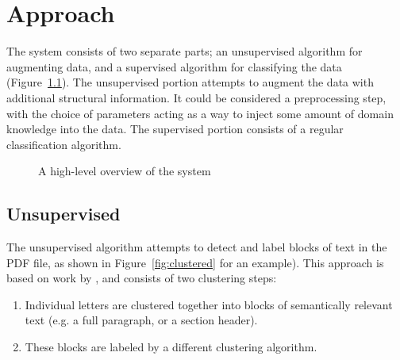 \chapter{Approach}

The system consists of two separate parts; an unsupervised algorithm for
augmenting data, and a supervised algorithm for classifying the data
(Figure~\ref{fig:overview}). The unsupervised portion attempts to augment the
data with additional structural information. It could be considered a
preprocessing step, with the choice of parameters acting as a way to inject some
amount of domain knowledge into the data. The supervised portion consists of a
regular classification algorithm. 

\begin{figure}[htbp]
  \centering
  \caption{A high-level overview of the system}
  \label{fig:overview}
\end{figure}

\section{Unsupervised}
The unsupervised algorithm attempts to detect and label blocks of text in the
PDF file, as shown in Figure~\ref{fig:clustered} for an example). This approach
is based on work by \textcite{klampfl2014unsupervised}, and consists of two
clustering steps:
\begin{enumerate}
\item Individual letters are clustered together into blocks of semantically
  relevant text (e.g. a full paragraph, or a section header).
\item These blocks are labeled by a different clustering algorithm.
\end{enumerate}

